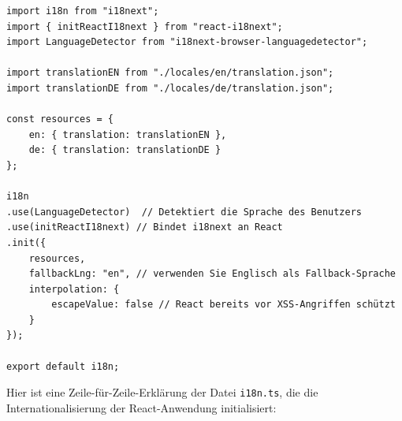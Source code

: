 \begin{lstlisting}[style=pseudocode, caption={Initialisierung von i18next in \texttt{i18n.ts}}, label={lst:i18n.ts}, breaklines=true]
import i18n from "i18next";
import { initReactI18next } from "react-i18next";
import LanguageDetector from "i18next-browser-languagedetector";

import translationEN from "./locales/en/translation.json";
import translationDE from "./locales/de/translation.json";

const resources = {
	en: { translation: translationEN },
	de: { translation: translationDE }
};

i18n
.use(LanguageDetector)  // Detektiert die Sprache des Benutzers
.use(initReactI18next) // Bindet i18next an React
.init({
	resources,
	fallbackLng: "en", // verwenden Sie Englisch als Fallback-Sprache
	interpolation: {
		escapeValue: false // React bereits vor XSS-Angriffen schützt
	}
});

export default i18n;
\end{lstlisting}

\noindent Hier ist eine Zeile-für-Zeile-Erklärung der Datei \texttt{i18n.ts}, die die Internationalisierung der React-Anwendung initialisiert:

